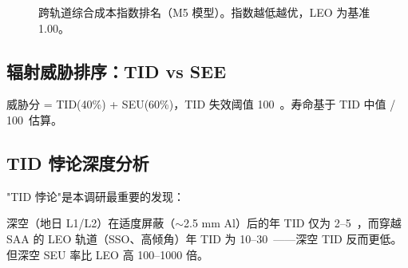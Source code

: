 \begin{figure}[H]
\centering

\caption{跨轨道综合成本指数排名（M5 模型）。指数越低越优，LEO 为基准 1.00。}
\label{fig:m5-ranking}
\end{figure}

\subsection{辐射威胁排序：TID vs SEE}

\begin{table}[H]
\centering
\caption{各轨道辐射威胁排序（M2 模型输出）}
\label{tab:m2-ranking}

\smallskip
\noindent 威胁分 = TID(40\%) + SEU(60\%)，TID 失效阈值 100~\kradyr。寿命基于 TID 中值 / 100~\kradyr 估算。
\end{table}

\subsection{TID 悖论深度分析}

"TID 悖论"是本调研最重要的发现：

\begin{observation}[TID悖论]
深空（地日 L1/L2）在适度屏蔽（$\sim$2.5 mm Al）后的年 TID 仅为 2--5~\kradyr，而穿越 SAA 的 LEO 轨道（SSO、高倾角）年 TID 为 10--30~\kradyr——深空 TID 反而更低。但深空 SEU 率比 LEO 高 100--1000 倍。
\end{observation}

